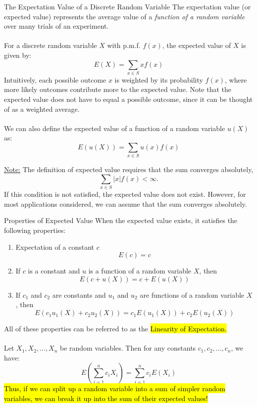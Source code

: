 ﻿\documentclass[12pt]{article}
\begin{document}
\leavevmode
\begin{definition}{The Expectation Value of a Discrete Random Variable}
    The expectation value (or expected value) represents the average value of a \textit{function of a random variable} over many trials of an experiment.\\\\
    For a discrete random variable $X$ with p.m.f. $f(x)$, the expected value of $X$ is given by:
    \[E(X) = \sum_{x \in S} x f(x)\]
    Intuitively, each possible outcome $x$ is weighted by its probability $f(x)$, where more likely outcomes contribute more to the expected value. Note that the expected value does not have to equal a possible outcome, since it can be thought of as a weighted average.\\\\
    We can also define the expected value of a function of a random variable $u(X)$ as:
    \[E(u(X)) = \sum_{x \in S} u(x) f(x)\]
\end{definition}
 \underline{Note:} The definition of expected value requires that the sum converges absolutely, 
\[\sum_{x \in S} |x|f(x) < \infty.\]
If this condition is not satisfied, the expected value does not exist. However, for most applications considered, we can assume that the sum converges absolutely.
\begin{theorem}{Properties of Expected Value}
When the expected value exists, it satisfies the following properties:
\begin{enumerate}
    \item [(a)] Expectation of a constant $c$
    \[E(c) = c\]
    \item [(b)] If $c$ is a constant and $u$ is a function of a random variable $X$, then
    \[E(c + u(X)) = c + E(u(X))\]
    \item [(c)] If $c_1$ and $c_2$ are constants and $u_1$ and $u_2$ are functions of a random variable $X$, then
    \[E(c_1 u_1(X) + c_2 u_2(X)) = c_1 E(u_1(X)) + c_2 E(u_2(X))\]
\end{enumerate}
All of these properties can be referred to as the \hl{Linearity of Expectation.}\\\\
Let $X_1, X_2, \ldots, X_n$ be random variables. Then for any constants $c_1, c_2, \ldots, c_n$, we have:
\[E\left(\sum_{i=1}^n c_i X_i\right) = \sum_{i=1}^n c_i E(X_i)\]
\hl{Thus, if we can split up a random variable into a sum of simpler random variables, we can break it up into the sum of their expected values!}
\end{theorem}
\end{document}
